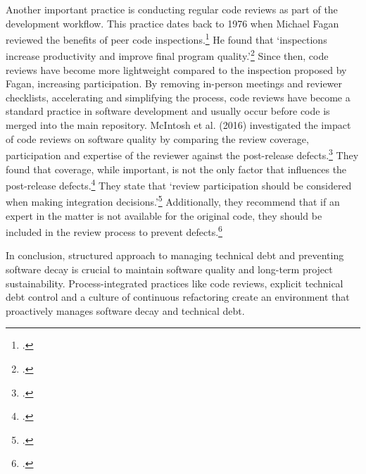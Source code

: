 Another important practice is conducting regular code reviews as part of the development workflow. This practice dates back to 1976 when Michael Fagan reviewed the benefits of peer code inspections.\footcite[183]{faganDesignCodeInspections1976}
He found that `inspections increase productivity and improve final program quality.'\footcite[205]{faganDesignCodeInspections1976}
Since then, code reviews have become more lightweight compared to the inspection proposed by Fagan, increasing participation. By removing in-person meetings and reviewer checklists, accelerating and simplifying the process, code reviews have become a standard practice in software development and usually occur before code is merged into the main repository.
McIntosh et al. (2016) investigated the impact of code reviews on software quality by comparing the review coverage, participation and expertise of the reviewer against the post-release defects.\footcite[6]{mcintoshEmpiricalStudyImpact2016}
They found that coverage, while important, is not the only factor that influences the post-release defects.\footcite[39]{mcintoshEmpiricalStudyImpact2016}
They state that `review participation should be considered when making integration decisions.'\footcite[39]{mcintoshEmpiricalStudyImpact2016}
Additionally, they recommend that if an expert in the matter is not available for the original code, they should be included in the review process to prevent defects.\footcite[39]{mcintoshEmpiricalStudyImpact2016}

In conclusion, structured approach to managing technical debt and preventing software decay is crucial to maintain software quality and long-term project sustainability.
Process-integrated practices like code reviews, explicit technical debt control and a culture of continuous refactoring create an environment that proactively manages software decay and technical debt.

